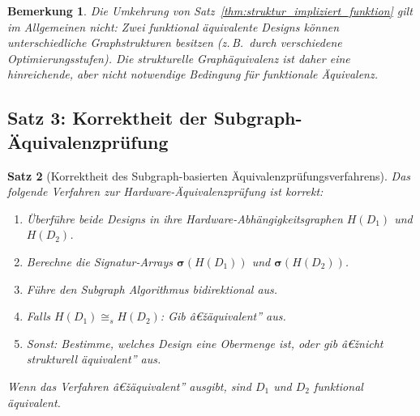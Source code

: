 ﻿\documentclass[12pt,a4paper]{report}
\newtheorem{theorem}{Satz}[section]
\newtheorem{bemerkung}[theorem]{Bemerkung}
\begin{document}
\begin{bemerkung}
Die Umkehrung von Satz~\ref{thm:struktur_impliziert_funktion} gilt im Allgemeinen \emph{nicht}: Zwei funktional äquivalente Designs können unterschiedliche Graphstrukturen besitzen (z.\,B.\ durch verschiedene Optimierungsstufen). Die strukturelle Graphäquivalenz ist daher eine \emph{hinreichende}, aber nicht notwendige Bedingung für funktionale Äquivalenz.
\end{bemerkung}

\subsection{Satz 3: Korrektheit der Subgraph-Äquivalenzprüfung}

\begin{theorem}[Korrektheit des Subgraph-basierten Äquivalenzprüfungsverfahrens]
\label{thm:korrektheit_aequivalenz}
Das folgende Verfahren zur Hardware-Äquivalenzprüfung ist korrekt:

\begin{enumerate}
    \item Überführe beide Designs in ihre Hardware-Abhängigkeitsgraphen $H(D_1)$ und $H(D_2)$.
    \item Berechne die Signatur-Arrays $\boldsymbol{\sigma}(H(D_1))$ und $\boldsymbol{\sigma}(H(D_2))$.
    \item Führe den Subgraph Algorithmus bidirektional aus.
    \item Falls $H(D_1) \cong_s H(D_2)$: Gib â€žäquivalent'' aus.
    \item Sonst: Bestimme, welches Design eine Obermenge ist, oder gib â€žnicht strukturell äquivalent'' aus.
\end{enumerate}

Wenn das Verfahren â€žäquivalent'' ausgibt, sind $D_1$ und $D_2$ funktional äquivalent.
\end{theorem}
\end{document}
